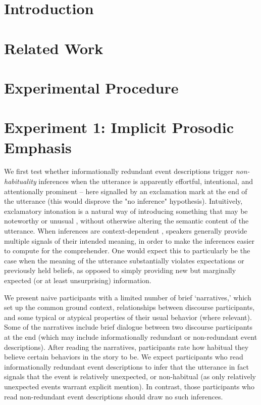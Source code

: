 \documentclass{sp}\usepackage[]{graphicx}\usepackage[]{color}
\begin{document}
\pagebreak

\section{Introduction}\label{intro}



\section{Related Work}\label{related-work}



\section{Experimental Procedure}\label{expintro}



\section{Experiment 1: Implicit Prosodic Emphasis}\label{exp1}



We first test whether informationally redundant event descriptions trigger \textit{non-habituality} inferences when the utterance is apparently effortful, intentional, and attentionally prominent -- here signalled by an exclamation mark at the end of the utterance (this would disprove the "no inference" hypothesis). Intuitively, exclamatory intonation is a natural way of introducing something that may be noteworthy or unusual \citep{Rett2011}, without otherwise altering the semantic content of the utterance. When inferences are context-dependent \citep[and even if they are not; see][]{Degen2015b}, speakers generally provide multiple signals of their intended meaning, in order to make the inferences easier to compute for the comprehender. One would expect this to particularly be the case when the meaning of the utterance substantially violates expectations or previously held beliefs, as opposed to simply providing new but marginally expected (or at least unsurprising) information.

We present naive participants with a limited number of brief `narratives,' which set up the common ground context, relationships between discourse participants, and some typical or atypical properties of their usual behavior (where relevant). Some of the narratives include brief dialogue between two discourse participants at the end (which may include informationally redundant or non-redundant event descriptions). After reading the narratives, participants rate how habitual they believe certain behaviors in the story to be. We expect participants who read informationally redundant event descriptions to infer that the utterance in fact signals that the event is relatively unexpected, or non-habitual (as only relatively unexpected events warrant explicit mention). In contrast, those participants who read non-redundant event descriptions should draw no such inferences.
\end{document}
